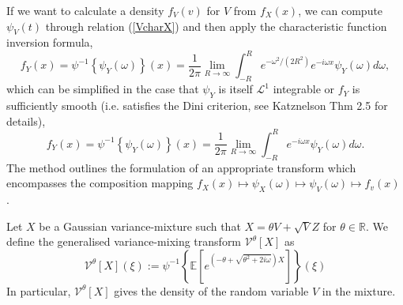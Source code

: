 \documentclass{article}
\begin{document}
If we want to calculate a density $f_V(v)$ for $V$ from $f_X(x)$, we can compute $\psi_V(t)$ through relation (\ref{VcharX}) and then apply the characteristic function inversion formula,
\begin{equation}
    f_Y(x) = \psi^{-1}\left\{\psi_Y(\omega)\right\}(x) = \frac{1}{2\pi}\lim_{R\to\infty}\int_{-R}^{R}e^{-\omega^2/(2R^2)}e^{-i\omega x} \psi_Y(\omega)d\omega,
\end{equation}
which can be simplified in the case that $\psi_Y$ is itself $\mathcal{L}^1$ integrable or $f_Y$ is sufficiently smooth (i.e. satisfies the Dini criterion, see Katznelson \cite{Katznelson} Thm 2.5 for details),  
\begin{equation}
    f_Y(x) = \psi^{-1}\left\{\psi_Y(\omega)\right\}(x) = \frac{1}{2\pi}\lim_{R\to\infty}\int_{-R}^{R}e^{-i\omega x} \psi_Y(\omega)d\omega.
\end{equation}
The method outlines the formulation of an appropriate transform which encompasses the composition mapping $f_X(x)\mapsto \psi_X(\omega)\mapsto \psi_V(\omega)\mapsto f_v(x)$ .
\begin{definition}\label{variancemixingtransform}
    Let $X$ be a Gaussian variance-mixture such that $X = \theta V+ \sqrt{V}Z$ for $\theta\in\mathbb{R}$. We define the generalised variance-mixing transform $\mathcal{V}^\theta[X]$ as
    \begin{equation}\label{ShenoyTransformTheta}
    \mathcal{V}^\theta\left[X\right](\xi) :=
    \psi^{-1}\left\{\mathbb{E}\left[e^{\left(-\theta+\sqrt{\theta^2+2i\omega}\right)X}\right]\right\}(\xi)
    \end{equation}
    In particular, $\mathcal{V}^\theta\left[X\right]$ gives the density of the random variable $V$ in the mixture.
\end{definition}
\end{document}

